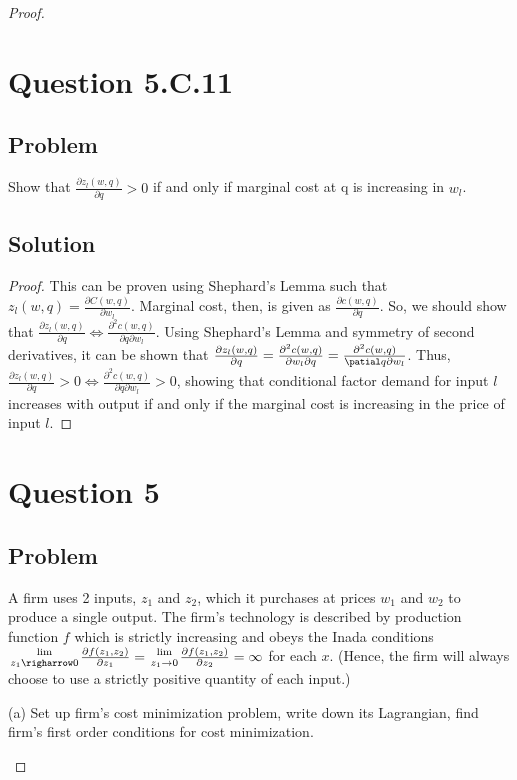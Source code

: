 \documentclass[10pt, a4paper]{article}
\begin{document}
\begin{proof}
\begin{center}
  \section{Question 5.C.11}
    \subsection{Problem}
      Show that $\frac{\partial z_l(w,q)}{\partial q}>0$ if and only if marginal cost at q is increasing in $w_l$.
    \subsection{Solution}
      \begin{proof}
        This can be proven using Shephard's Lemma such that $z_l(w,q) = \frac{\partial C(w,q)}{\partial w_l}$. Marginal cost, then, is given as $\frac{\partial c(w,q)}{\partial q}$. So, we should show that $\frac{\partial z_l (w,q)}{\partial q}\Leftrightarrow \frac{\partial^2c(w,q)}{\partial q\partial w_l}$. Using Shephard's Lemma and symmetry of second derivatives, it can be shown that $\frac{\partial z_l(w,q)}{\partial q} = \frac{\partial^2 c(w,q)}{\partial w_l\partial q}=\frac{\partial^2 c(w,q)}{\patial q\partial w_l}$. Thus, $\frac{\partial z_l(w,q)}{\partial q}>0\Leftrightarrow \frac{\partial^2c(w,q)}{\partial q\partial w_l}>0$, showing that conditional factor demand for input $l$ increases with output if and only if the marginal cost is increasing in the price of input $l$.
      \end{proof}
  \section{Question 5}
    \subsection{Problem}
      A firm uses 2 inputs, $z_1$ and $z_2$, which it purchases at prices $w_1$ and $w_2$ to produce a single output. The firm's technology is described by production function $f$ which is strictly increasing and obeys the Inada conditions ${\lim\atop{z_1\righarrow0}}\frac{\partial f(z_1,z_2)}{\partial z_1}={\lim\atop{z_1\rightarrow0}}\frac{\partial f(z_1, z_2)}{\partial z_2}=\infty$ for each $x$. (Hence, the firm will always choose to use a strictly positive quantity of each input.)

      (a) Set up firm's cost minimization problem, write down its Lagrangian, find firm's first order conditions for cost minimization.


\end{center}
\end{proof}
\end{document}
